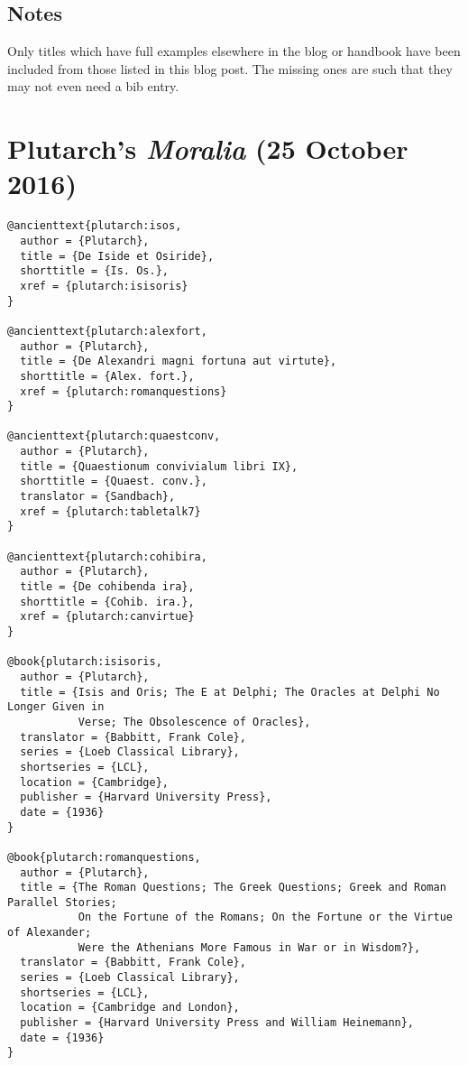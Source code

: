 \documentclass[a4paper]{article}
\begin{document}
\subsection{Notes}

Only titles which have full examples elsewhere in the blog or handbook have
been included from those listed in this blog post. The missing ones are such
that they may not even need a bib entry.


\section{Plutarch’s \emph{Moralia} (25 October 2016)}

\begin{verbatim}
@ancienttext{plutarch:isos,
  author = {Plutarch},
  title = {De Iside et Osiride},
  shorttitle = {Is. Os.},
  xref = {plutarch:isisoris}
}

@ancienttext{plutarch:alexfort,
  author = {Plutarch},
  title = {De Alexandri magni fortuna aut virtute},
  shorttitle = {Alex. fort.},
  xref = {plutarch:romanquestions}
}

@ancienttext{plutarch:quaestconv,
  author = {Plutarch},
  title = {Quaestionum convivialum libri IX},
  shorttitle = {Quaest. conv.},
  translator = {Sandbach},
  xref = {plutarch:tabletalk7}
}

@ancienttext{plutarch:cohibira,
  author = {Plutarch},
  title = {De cohibenda ira},
  shorttitle = {Cohib. ira.},
  xref = {plutarch:canvirtue}
}

@book{plutarch:isisoris,
  author = {Plutarch},
  title = {Isis and Oris; The E at Delphi; The Oracles at Delphi No Longer Given in
           Verse; The Obsolescence of Oracles},
  translator = {Babbitt, Frank Cole},
  series = {Loeb Classical Library},
  shortseries = {LCL},
  location = {Cambridge},
  publisher = {Harvard University Press},
  date = {1936}
}

@book{plutarch:romanquestions,
  author = {Plutarch},
  title = {The Roman Questions; The Greek Questions; Greek and Roman Parallel Stories;
           On the Fortune of the Romans; On the Fortune or the Virtue of Alexander;
           Were the Athenians More Famous in War or in Wisdom?},
  translator = {Babbitt, Frank Cole},
  series = {Loeb Classical Library},
  shortseries = {LCL},
  location = {Cambridge and London},
  publisher = {Harvard University Press and William Heinemann},
  date = {1936}
}


\end{verbatim}
\end{document}
